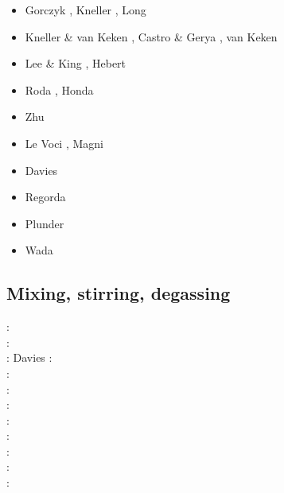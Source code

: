 \begin{scriptsize}
\begin{itemize}
\item[\twothousandseven] Gorczyk \etal \cite{gogc07}, Kneller \etal \cite{knvk07}, Long \etal \cite{lohd07}\\
\item[\twothousandeight] Kneller \& van Keken \cite{knva08}, Castro \& Gerya \cite{cage08}, 
                         van Keken \etal \cite{vack08}\\
\item[\twothousandnine] Lee \& King \cite{leki09}, Hebert \etal \cite{heaa09}\\
\item[\twothousandten] Roda \etal \cite{roms10}, Honda \etal \cite{hogz10} \\
\item[\twothousandeleven] Zhu \etal \cite{zhgh11}\\
\item[\twothousandfourteen] Le Voci \etal \cite{ledg14}, Magni \etal \cite{mabv14}\\
\item[\twothousandsixteen] Davies \etal \cite{dalg16} \\
\item[\twothousandseventeen] Regorda \etal \cite{rerm17}\\
\item[\twothousandeighteen] Plunder \etal \cite{pltv18}
\item[\twothousandtwentyone] Wada \cite{wada81}
\end{itemize}
\end{scriptsize}

\subsection{Mixing, stirring, degassing} 

\begin{scriptsize}
\nineteeneightyfour: \cite{olyb84}\\
\nineteenninety: \cite{ketu90}\\
\nineteenninety: Davies \cite{davi90}
\nineteenninetysix: \cite{pelt96}\\
\nineteenninetynine: \cite{cori99}\\
\twothousandone: \cite{huke01}\\
\twothousandtwo: \cite{vahb02}\\
\twothousandthree: \cite{fasa03}\cite{vabh03}\\
\twothousandfive: \cite{colt05}\\
\twothousandseven: \cite{gogc07}\cite{nake07}\cite{vabh07}\\
\twothousandeleven: \cite{lemj11}\cite{saad11}\\
\twothousandeighteen: \cite{onzh18}
\end{scriptsize}


